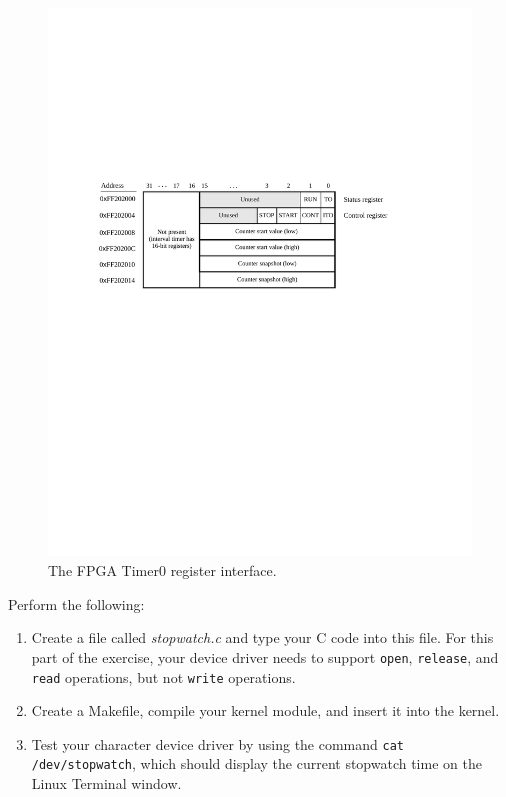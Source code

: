 \documentclass[epsfig,10pt,fullpage]{article}
\begin{document}
~\\
\begin{figure}[htb]
	\begin{center}
	\includegraphics[scale=1]{figures/fig_interval_port.pdf}
	\end{center}
	\caption{The FPGA Timer0 register interface.}
\label{fig:timer}
\end{figure}

\newpage
\noindent
Perform the following:

\begin{enumerate}
\item Create a file called {\it stopwatch.c} and type your C code into this file. For
this part of the exercise, your device driver needs to support \texttt{open},
\texttt{release}, and \texttt{read} operations, but not \texttt{write} operations.

\item
Create a Makefile, compile your kernel module, and insert it into the kernel. 

\item
Test your character device driver by using the command \texttt{cat /dev/stopwatch}, which
should display the current stopwatch time on the Linux Terminal window.
\end{enumerate}
\end{document}
